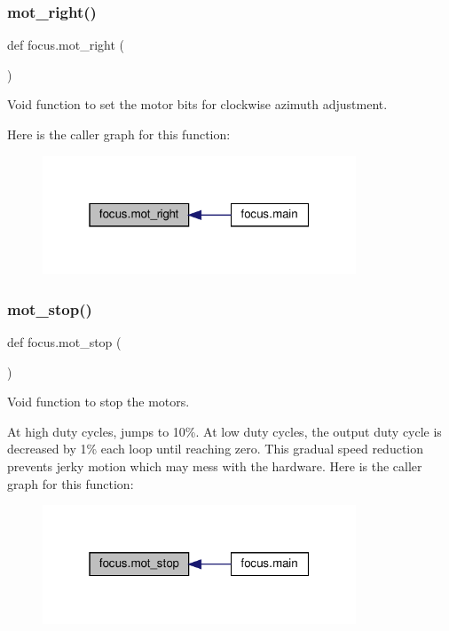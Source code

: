 \subsubsection{\texorpdfstring{mot\+\_\+right()}{mot\_right()}}
{\footnotesize\ttfamily def focus.\+mot\+\_\+right (\begin{DoxyParamCaption}{ }\end{DoxyParamCaption})}



Void function to set the motor bits for clockwise azimuth adjustment. 

Here is the caller graph for this function\+:\nopagebreak
\begin{figure}[H]
\begin{center}
\leavevmode
\includegraphics[width=265pt]{namespacefocus_a9939d6f9388d8eb82625bd8e3af6f894_icgraph}
\end{center}
\end{figure}
\mbox{\label{namespacefocus_a19641d526d4c19ab6b10fc8ca9e8fe86}} 
\subsubsection{\texorpdfstring{mot\+\_\+stop()}{mot\_stop()}}
{\footnotesize\ttfamily def focus.\+mot\+\_\+stop (\begin{DoxyParamCaption}{ }\end{DoxyParamCaption})}



Void function to stop the motors. 

At high duty cycles, jumps to 10\%. At low duty cycles, the output duty cycle is decreased by 1\% each loop until reaching zero. This gradual speed reduction prevents jerky motion which may mess with the hardware. Here is the caller graph for this function\+:\nopagebreak
\begin{figure}[H]
\begin{center}
\leavevmode
\includegraphics[width=265pt]{namespacefocus_a19641d526d4c19ab6b10fc8ca9e8fe86_icgraph}
\end{center}
\end{figure}
\mbox{\label{namespacefocus_ad0102bfe821a43392640e33721246a8c}} 
